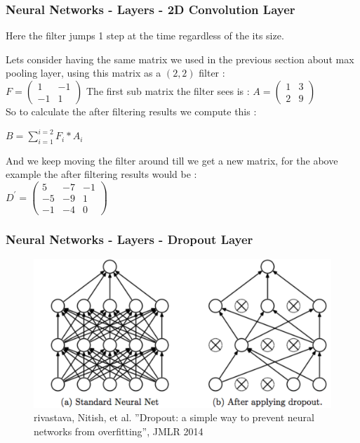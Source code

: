 \documentclass{beamer}
\begin{document}
\begin{frame}
\frametitle{Neural Networks - Layers - 2D Convolution Layer}
Here the filter jumps 1 step at the time regardless of the its size.\\
\begin{example}
Lets consider having the same matrix we used in the previous section about max pooling layer, using this matrix as a $ (2,2) $ filter :\\
$F = 
\begin{pmatrix}
1 & -1\\
-1 & 1
\end{pmatrix}
$
The first sub matrix the filter sees is : 
$A = 
\begin{pmatrix}
1 & 3\\
2 & 9
\end{pmatrix}
$\\
So to calculate the after filtering results we compute this :\\
\begin{center}
$ B = \sum_{i=1}^{i=2}F_i*A_i $
\end{center}
And we keep moving the filter around till we get a new matrix, for the above example the after filtering results would be :\\
$D^{\prime} = 
\begin{pmatrix}
5 & -7 & -1\\
-5 & -9 & 1\\
-1 & -4 & 0
\end{pmatrix}
$
\end{example}
\end{frame}

\begin{frame}
\frametitle{Neural Networks - Layers - Dropout Layer}
\begin{figure}
\centering
\includegraphics[scale=0.3]{dropout.png}
\caption{rivastava, Nitish, et al. ”Dropout: a simple way to prevent neural networks from
overfitting”, JMLR 2014}
\end{figure}
\end{frame}
\end{document}
